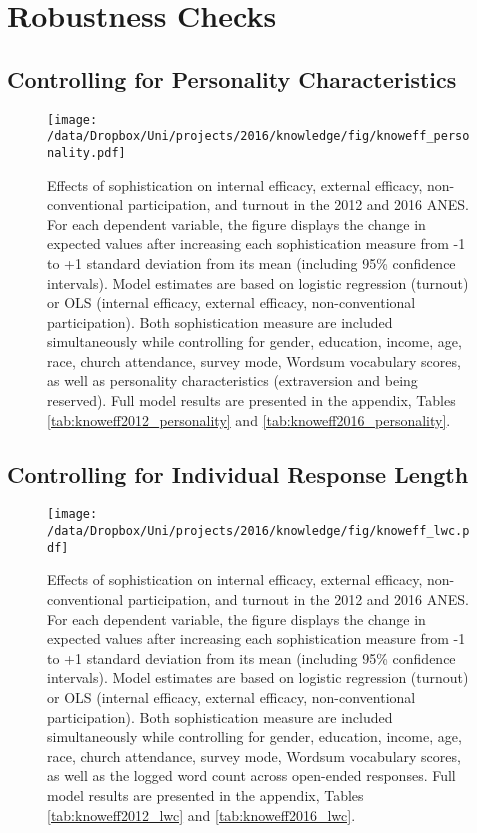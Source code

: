 \clearpage
\section{Robustness Checks}\label{app:personality}

\subsection{Controlling for Personality Characteristics}
\begin{figure}[h]\centering
\texttt{[image: /data/Dropbox/Uni/projects/2016/knowledge/fig/knoweff\_personality.pdf]}
\caption[Effects of sophistication on political engagement controlling for personality characteristics in the 2012 and 2016 ANES]{Effects of sophistication on internal efficacy, external efficacy, non-conventional participation, and turnout in the 2012 and 2016 ANES. For each dependent variable, the figure displays the change in expected values after increasing each sophistication measure from -1 to +1 standard deviation from its mean (including 95\% confidence intervals). Model estimates are based on logistic regression (turnout) or OLS (internal efficacy, external efficacy, non-conventional participation). Both sophistication measure are included simultaneously while controlling for gender, education, income, age, race, church attendance, survey mode, Wordsum vocabulary scores, as well as personality characteristics (extraversion and being reserved). Full model results are presented in the appendix, Tables \ref{tab:knoweff2012_personality} and \ref{tab:knoweff2016_personality}.
}\label{fig:knoweff_personality}
\end{figure}

\clearpage
\subsection{Controlling for Individual Response Length}
\begin{figure}[h]\centering
\texttt{[image: /data/Dropbox/Uni/projects/2016/knowledge/fig/knoweff\_lwc.pdf]}
\caption[Effects of sophistication on political engagement controlling for response length in the 2012 and 2016 ANES]{Effects of sophistication on internal efficacy, external efficacy, non-conventional participation, and turnout in the 2012 and 2016 ANES. For each dependent variable, the figure displays the change in expected values after increasing each sophistication measure from -1 to +1 standard deviation from its mean (including 95\% confidence intervals). Model estimates are based on logistic regression (turnout) or OLS (internal efficacy, external efficacy, non-conventional participation). Both sophistication measure are included simultaneously while controlling for gender, education, income, age, race, church attendance, survey mode, Wordsum vocabulary scores, as well as the logged word count across open-ended responses. Full model results are presented in the appendix, Tables \ref{tab:knoweff2012_lwc} and \ref{tab:knoweff2016_lwc}.
}\label{fig:knoweff_lwc}
\end{figure}


